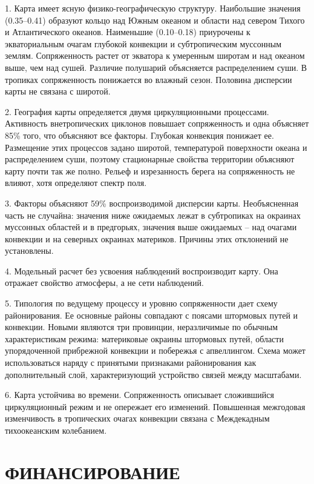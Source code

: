 \documentclass[12pt,a4paper]{article}
\begin{document}
1. Карта имеет ясную физико-географическую структуру. Наибольшие значения (0.35--0.41) образуют кольцо над Южным океаном и области над севером Тихого и Атлантического океанов. Наименьшие (0.10--0.18) приурочены к экваториальным очагам глубокой конвекции и субтропическим муссонным землям. Сопряженность растет от экватора к умеренным широтам и над океаном выше, чем над сушей. Различие полушарий объясняется распределением суши. В тропиках сопряженность понижается во влажный сезон. Половина дисперсии карты не связана с широтой.

2. География карты определяется двумя циркуляционными процессами. Активность внетропических циклонов повышает сопряженность и одна объясняет 85\% того, что объясняют все факторы. Глубокая конвекция понижает ее. Размещение этих процессов задано широтой, температурой поверхности океана и распределением суши, поэтому стационарные свойства территории объясняют карту почти так же полно. Рельеф и изрезанность берега на сопряженность не влияют, хотя определяют спектр поля.

3. Факторы объясняют 59\% воспроизводимой дисперсии карты. Необъясненная часть не случайна: значения ниже ожидаемых лежат в субтропиках на окраинах муссонных областей и в предгорьях, значения выше ожидаемых -- над очагами конвекции и на северных окраинах материков. Причины этих отклонений не установлены.

4. Модельный расчет без усвоения наблюдений воспроизводит карту. Она отражает свойство атмосферы, а не сети наблюдений.

5. Типология по ведущему процессу и уровню сопряженности дает схему районирования. Ее основные районы совпадают с поясами штормовых путей и конвекции. Новыми являются три провинции, неразличимые по обычным характеристикам режима: материковые окраины штормовых путей, области упорядоченной прибрежной конвекции и побережья с апвеллингом. Схема может использоваться наряду с принятыми признаками районирования как дополнительный слой, характеризующий устройство связей между масштабами.

6. Карта устойчива во времени. Сопряженность описывает сложившийся циркуляционный режим и не опережает его изменений. Повышенная межгодовая изменчивость в тропических очагах конвекции связана с Междекадным тихоокеанским колебанием.

\section{ФИНАНСИРОВАНИЕ}
\end{document}
